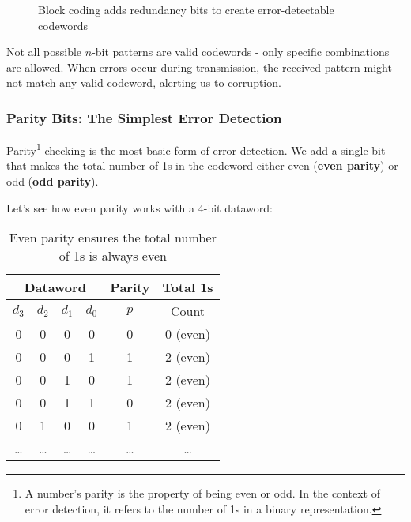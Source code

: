 \begin{figure}[h]
    \centering
    \caption{Block coding adds redundancy bits to create error-detectable codewords}
    \label{fig:block_coding}
\end{figure}

Not all possible $n$-bit patterns are valid codewords - only specific combinations are allowed. When errors occur during transmission, the received pattern might not match any valid codeword, alerting us to corruption.

\subsubsection{Parity Bits: The Simplest Error Detection}
Parity\footnote{A number's parity is the property of being even or odd. In the context of error detection, it refers to the number of 1s in a binary representation.} checking is the most basic form of error detection. We add a single bit that makes the total number of 1s in the codeword either even (\textbf{even parity}) or odd (\textbf{odd parity}).

Let's see how even parity works with a 4-bit dataword:

\begin{table}[h]
\centering
\begin{tabular}{|c|c|c|c|c|c|}
\hline
\multicolumn{4}{|c|}{Dataword} & Parity & \multicolumn{1}{c|}{Total 1s} \\
\hline
$d_3$ & $d_2$ & $d_1$ & $d_0$ & $p$ & Count \\
\hline
0 & 0 & 0 & 0 & 0 & 0 (even) \\
0 & 0 & 0 & 1 & 1 & 2 (even) \\
0 & 0 & 1 & 0 & 1 & 2 (even) \\
0 & 0 & 1 & 1 & 0 & 2 (even) \\
0 & 1 & 0 & 0 & 1 & 2 (even) \\
\ldots & \ldots & \ldots & \ldots & \ldots & \ldots \\
\hline
\end{tabular}
\caption{Even parity ensures the total number of 1s is always even}
\label{tab:parity_example}
\end{table}

